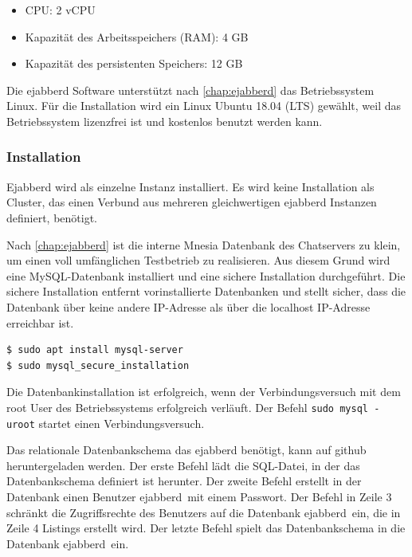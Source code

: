 \documentclass[a4paper,titlepage,halfparskip,12pt]{scrreprt}
\begin{document}
\begin{onehalfspacing}
\begin{itemize}
\item CPU: 2 vCPU
\item Kapazität des Arbeitsspeichers (RAM): 4 GB
\item Kapazität des persistenten Speichers: 12 GB
\end{itemize}

Die ejabberd Software unterstützt nach \autoref{chap:ejabberd} das Betriebssystem Linux. Für die Installation wird ein Linux Ubuntu 18.04 (LTS) gewählt, weil das Betriebssystem lizenzfrei ist und kostenlos benutzt werden kann.

\subsubsection*{Installation}

Ejabberd wird als einzelne Instanz installiert. Es wird keine Installation als Cluster, das einen Verbund aus mehreren gleichwertigen ejabberd Instanzen definiert, benötigt.

Nach \autoref{chap:ejabberd} ist die interne Mnesia Datenbank des Chatservers zu klein, um einen voll umfänglichen Testbetrieb zu realisieren. Aus diesem Grund wird eine MySQL-Datenbank installiert und eine sichere Installation durchgeführt. Die sichere Installation entfernt vorinstallierte Datenbanken und stellt sicher, dass die Datenbank über keine andere IP-Adresse als über die localhost IP-Adresse erreichbar ist.

\bigskip

\begin{lstlisting}[language=bash, caption={Installation der Mysql-Datenbank}]
$ sudo apt install mysql-server
$ sudo mysql_secure_installation
\end{lstlisting}

Die Datenbankinstallation ist erfolgreich, wenn der Verbindungsversuch mit dem root User des Betriebssystems erfolgreich verläuft. Der Befehl \texttt{sudo mysql -uroot} startet einen Verbindungsversuch.

Das relationale Datenbankschema das ejabberd benötigt, kann auf github heruntergeladen werden. Der erste Befehl lädt die SQL-Datei, in der das Datenbankschema definiert ist herunter. Der zweite Befehl erstellt in der Datenbank einen Benutzer \glqq ejabberd\grqq\ mit einem Passwort. Der Befehl in Zeile 3 schränkt die Zugriffsrechte des Benutzers auf die Datenbank \glqq ejabberd\grqq\ ein, die in Zeile 4 Listings erstellt wird. Der letzte Befehl spielt das Datenbankschema in die Datenbank \glqq ejabberd\grqq\ ein.


\end{onehalfspacing}
\end{document}
